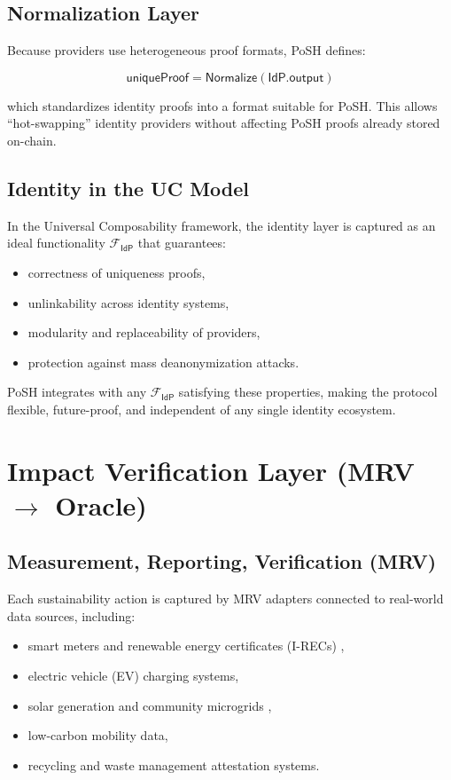 \documentclass[11pt,a4paper]{report}
\theoremstyle{definition}
\theoremstyle{remark}
\begin{document}
\subsection{Normalization Layer}

Because providers use heterogeneous proof formats, PoSH defines:

\[
\mathsf{uniqueProof} = \textsf{Normalize}(\textsf{IdP.output})
\]

which standardizes identity proofs into a format suitable for PoSH. This allows
``hot-swapping'' identity providers without affecting PoSH proofs already stored
on-chain.

\subsection{Identity in the UC Model}

In the Universal Composability framework, the identity layer is captured as an
ideal functionality $\mathcal{F}_{\textsf{IdP}}$ that guarantees:

\begin{itemize}[leftmargin=*]
  \item correctness of uniqueness proofs,
  \item unlinkability across identity systems,
  \item modularity and replaceability of providers,
  \item protection against mass deanonymization attacks.
\end{itemize}

PoSH integrates with any $\mathcal{F}_{\textsf{IdP}}$ satisfying these
properties, making the protocol flexible, future-proof, and independent of any
single identity ecosystem.

\section{Impact Verification Layer (MRV $\rightarrow$ Oracle)}

\subsection{Measurement, Reporting, Verification (MRV)}

Each sustainability action is captured by MRV adapters connected to real-world
data sources, including:

\begin{itemize}[leftmargin=*]
    \item smart meters and renewable energy certificates (I-RECs) \cite{khurana2023recBlockchain},
    \item electric vehicle (EV) charging systems,
    \item solar generation and community microgrids \cite{fu2023recCommunity},
    \item low-carbon mobility data,
    \item recycling and waste management attestation systems.
\end{itemize}
\end{document}
